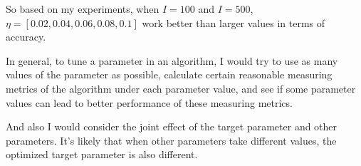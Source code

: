 \documentclass[paper=letter, fontsize=12pt]{article}
\begin{document}
\begin{enumerate}
\begin{enumerate}
	So based on my experiments, when $I = 100$ and $I = 500$, $\eta = [0.02, 0.04, 0.06, 0.08, 0.1]$ work better than larger values in terms of accuracy.
	
	In general, to tune a parameter in an algorithm, I would try to use as many values of the parameter as possible, calculate certain reasonable measuring metrics of the algorithm under each parameter value, and see if some parameter values can lead to better performance of these measuring metrics. 
	
	And also I would consider the joint effect of the target parameter and other parameters. It's likely that when other parameters take different values, the optimized target parameter is also different.
\end{enumerate}
\end{enumerate}
\end{document}
